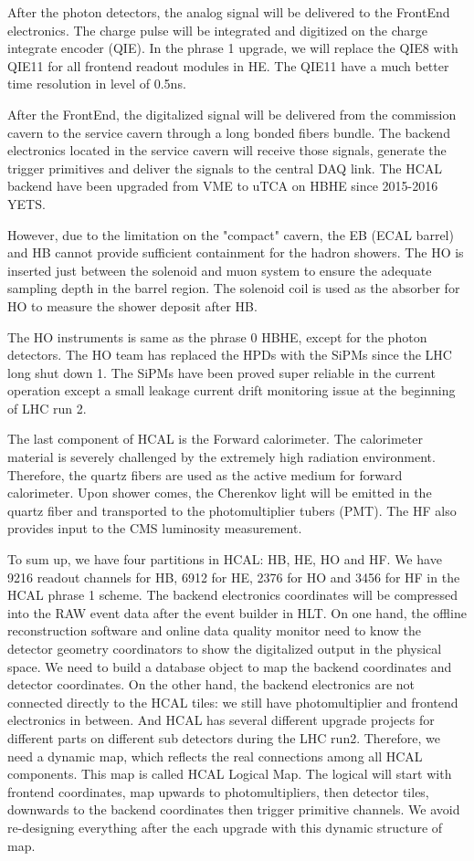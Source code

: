 After the photon detectors, the analog signal will be delivered to the FrontEnd electronics. The charge pulse will be integrated and digitized on the charge integrate encoder (QIE). In the phrase 1 upgrade, we will replace the QIE8 with QIE11 for all frontend readout modules in HE. The QIE11 have a much better time resolution in level of 0.5ns. 

After the FrontEnd, the digitalized signal will be delivered from the commission cavern to the service cavern through a long bonded fibers bundle. The backend electronics located in the service cavern will receive those signals, generate the trigger primitives and deliver the signals to the central DAQ link. The HCAL backend have been upgraded from VME to uTCA on HBHE since 2015-2016 YETS. 

However, due to the limitation on the "compact" cavern, the EB (ECAL barrel) and HB cannot provide sufficient containment for the hadron showers. The HO is inserted just between the solenoid and muon system to ensure the adequate sampling depth in the barrel region. The solenoid coil is used as the absorber for HO to measure the shower deposit after HB. 

The HO instruments is same as the phrase 0 HBHE, except for the photon detectors. The HO team has replaced the HPDs with the SiPMs since the LHC long shut down 1. The SiPMs have been proved super reliable in the current operation except a small leakage current drift monitoring issue at the beginning of LHC run 2. 

The last component of HCAL is the Forward calorimeter. The calorimeter material is severely challenged by the extremely high radiation environment. Therefore, the quartz fibers are used as the active medium for forward calorimeter. Upon shower comes, the Cherenkov light will be emitted in the quartz fiber and transported to the photomultiplier tubers (PMT). The HF also provides input to the CMS luminosity measurement. 

To sum up, we have four partitions in HCAL: HB, HE, HO and HF. We have 9216 readout channels for HB, 6912 for HE, 2376 for HO and 3456 for HF in the HCAL phrase 1 scheme. The backend electronics coordinates will be compressed into the RAW event data after the event builder in HLT. On one hand, the offline reconstruction software and online data quality monitor need to know the detector geometry coordinators to show the digitalized output in the physical space. We need to build a database object to map the backend coordinates and detector coordinates. On the other hand, the backend electronics are not connected directly to the HCAL tiles: we still have photomultiplier and frontend electronics in between. And HCAL has several different upgrade projects for different parts on different sub detectors during the LHC run2. Therefore, we need a dynamic map, which reflects the real connections among all HCAL components. This map is called HCAL Logical Map. The logical will start with frontend coordinates, map upwards to photomultipliers, then detector tiles, downwards to the backend coordinates then trigger primitive channels. We avoid re-designing everything after the each upgrade with this dynamic structure of map. 

